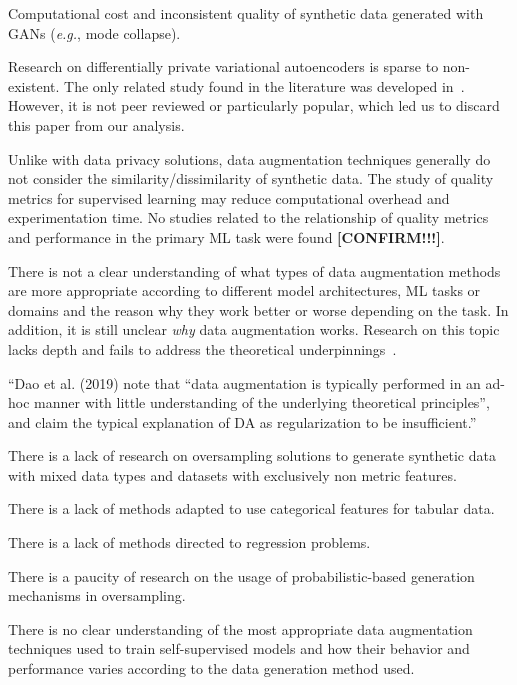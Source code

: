 \documentclass[parskip=full]{scrartcl}
\begin{document}
Computational cost and inconsistent quality of synthetic data generated with
GANs (\textit{e.g.}, mode collapse).

Research on differentially private variational autoencoders is sparse to
non-existent. The only related study found in the literature was developed
in~\cite{takahashi2020differentially}. However, it is not peer reviewed or
particularly popular, which led us to discard this paper from our analysis.

Unlike with data privacy solutions, data augmentation techniques generally do
not consider the similarity/dissimilarity of synthetic data. The study of
quality metrics for supervised learning may reduce computational overhead and
experimentation time. No studies related to the relationship of quality
metrics and performance in the primary ML task were found
\textbf{[CONFIRM!!!]}.

There is not a clear understanding of what types of data augmentation methods
are more appropriate according to different model architectures, ML tasks or
domains and the reason why they work better or worse depending on the task. 
In addition, it is still unclear \textit{why} data augmentation works.
Research on this topic lacks depth and fails to address the theoretical
underpinnings~\cite{feng2021survey}.

``Dao et al. (2019) note that ``data augmentation is typically performed in an
ad-hoc manner with little understanding of the underlying theoretical
principles'', and claim the typical explanation of DA as regularization to be
insufficient.''~\cite{feng2021survey}

There is a lack of research on oversampling solutions to generate synthetic
data with mixed data types and datasets with exclusively non metric features.

There is a lack of methods adapted to use categorical features for tabular
data.

There is a lack of methods directed to regression problems.

There is a paucity of research on the usage of probabilistic-based generation
mechanisms in oversampling.



There is no clear understanding of the most appropriate data augmentation
techniques used to train self-supervised models and how their behavior and
performance varies according to the data generation method used.
\end{document}
